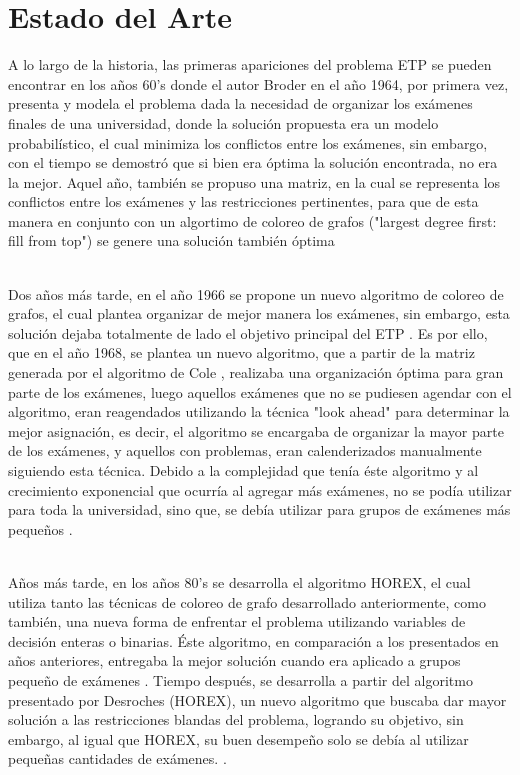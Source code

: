 \section{Estado del Arte}
\label{Estado}
A lo largo de la historia, las primeras apariciones del problema ETP se pueden encontrar en los años 60's donde el autor Broder \cite{Cita7} en el año 1964, por primera vez, presenta y modela el problema dada la necesidad de organizar los exámenes finales de una universidad, donde la solución propuesta era un modelo probabilístico, el cual minimiza los conflictos entre los exámenes, sin embargo, con el tiempo se demostró que si bien era óptima la solución encontrada, no era la mejor. Aquel año, también se propuso una matriz, en la cual se representa los conflictos entre los exámenes y las restricciones pertinentes, para que de esta manera en conjunto con un algortimo de coloreo de grafos ("largest degree first: fill from top") se genere una solución también óptima \cite{Cita8}
\begin{itemize}
\end{itemize}
\\
Dos años más tarde, en el año 1966 se propone un nuevo algoritmo de coloreo de grafos, el cual plantea organizar de mejor manera los exámenes, sin embargo, esta solución dejaba totalmente de lado el objetivo principal del ETP \cite{Cita9}. Es por ello, que en el año 1968, se plantea un nuevo algoritmo, que a partir de la matriz generada por el algoritmo de Cole \cite{Cita8}, realizaba una organización óptima para gran parte de los exámenes, luego aquellos exámenes que no se pudiesen agendar con el algoritmo, eran reagendados utilizando la técnica "look ahead" para determinar la mejor asignación, es decir, el algoritmo se encargaba de organizar la mayor parte de los exámenes, y aquellos con problemas, eran calenderizados manualmente siguiendo esta técnica. Debido a la complejidad que tenía éste algoritmo y al crecimiento exponencial que ocurría al agregar más exámenes, no se podía utilizar para toda la universidad, sino que, se debía utilizar para grupos de exámenes más pequeños \cite{Cita10}.
\begin{itemize}
\end{itemize}
\\
Años más tarde, en los años 80's se desarrolla el algoritmo HOREX, el cual utiliza tanto las técnicas de coloreo de grafo desarrollado anteriormente, como también, una nueva forma de enfrentar el problema utilizando variables de decisión enteras o binarias. Éste algoritmo, en comparación a los presentados en años anteriores, entregaba la mejor solución cuando era aplicado a grupos pequeño de exámenes \cite{Cita11}. Tiempo después, se desarrolla a partir del algoritmo presentado por Desroches (HOREX), un nuevo algoritmo que buscaba dar mayor solución a las restricciones blandas del problema, logrando su objetivo, sin embargo, al igual que HOREX, su buen desempeño solo se debía al utilizar pequeñas cantidades de exámenes. \cite{Cita12}.
